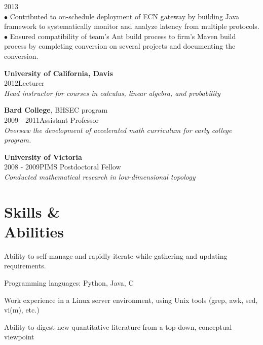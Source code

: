 \documentclass[margin]{res}
\begin{document}
\begin{resume}
\begin{list1}
2013 \\[0.05cm]
$\bullet$ Contributed to  on-schedule deployment of ECN gateway by building Java framework to systematically monitor and analyze latency from multiple protocols.\\[0.05cm]
$\bullet$ Ensured compatibility of team's Ant build process to firm's Maven build process by completing conversion on several projects and documenting the conversion.
\\[-0.3cm]
\item {\bf University of California, Davis}\\
2012\qquad Lecturer\\
{\it Head instructor for courses in calculus, linear algebra, and probability}\vspace{0.05cm}
\item {\bf Bard College}, BHSEC program\\
2009 - 2011\qquad Assistant Professor\\
{\it Oversaw the development of accelerated math curriculum for early college program.}\vspace{0.05cm}
\item {\bf University of Victoria}\\
2008 - 2009\qquad PIMS Postdoctoral Fellow\\
{\it Conducted mathematical research in low-dimensional topology}
\end{list1}
\vspace{-0.15in}

\section{\helv Skills \&\\ Abilities}
\begin{list1}
\item Ability to self-manage and rapidly iterate while gathering and updating requirements.
\item Programming languages: {\helv Python}, { \helv Java}, {\helv C}
\item Work experience in a Linux server environment, using Unix tools (grep, awk, sed, vi(m), etc.)
\item Ability to digest new quantitative literature from a top-down, conceptual viewpoint
\end{list1}

\vspace{-0.1in}


\end{resume}
\end{document}
